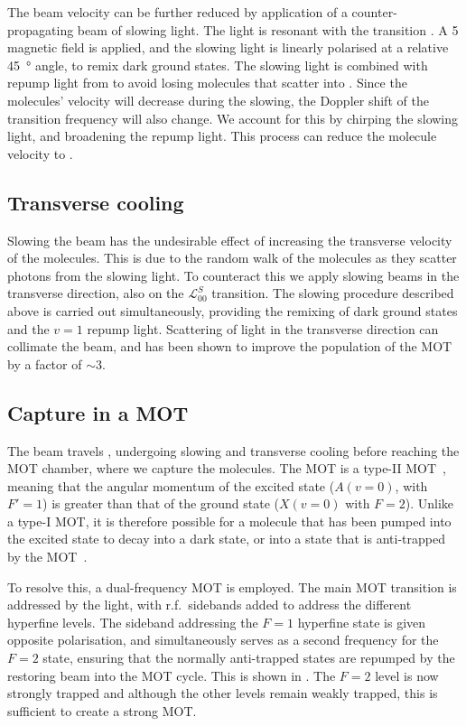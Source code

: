 The beam velocity can be further reduced by application of a counter-propagating
beam of slowing light. The light is resonant with the  transition . A \SI{5}{\gauss} magnetic field is
applied, and the slowing light is linearly polarised at a relative
\SI{45}{\degree} angle, to remix dark ground states. The slowing light is
combined with repump light from 
to avoid losing molecules that scatter into . Since the molecules'
velocity will decrease during the slowing, the Doppler shift of the transition
frequency will also change. We account for this by chirping the slowing light,
and broadening the repump light. This process can reduce the molecule velocity
to .

\subsection*{Transverse cooling}

Slowing the beam has the undesirable effect of increasing the transverse
velocity of the molecules. This is due to the random walk of the molecules as
they scatter photons from the slowing light. To counteract this we apply
slowing beams in the transverse direction, also on the $\mathcal{L}_{00}^S$
transition. The slowing procedure described above is carried out
simultaneously, providing the remixing of dark ground states and the $v=1$
repump light.
%
Scattering of light in the transverse direction can collimate the beam, and has
been shown to improve the population of the MOT by a factor of $\sim3$. 

\subsection*{Capture in a MOT}

The \CaF{} beam travels , undergoing slowing and transverse
cooling before reaching the MOT chamber, where we capture the molecules. The
\CaF{} MOT is a type-II MOT~\cite{}, meaning that the angular momentum of the
excited state ($A(v=0)$, with $F'=1$) is greater than that of the ground state
($X(v=0)$ with $F=2$). Unlike a type-I MOT, it is therefore possible for a
molecule that has been pumped into the excited state to decay into a dark
state, or into a state that is anti-trapped by the MOT~\cite{}.

To resolve this, a dual-frequency MOT is employed. The main MOT transition is
addressed by the  light, with r.f.\ sidebands added to address
the different hyperfine levels. The sideband addressing the $F=1$ hyperfine
state is given opposite polarisation, and simultaneously serves as a second
frequency for the $F=2$ state, ensuring that the normally anti-trapped states
are repumped by the restoring beam into the MOT cycle. This is shown in . The $F=2$ level is now strongly trapped and although the other levels
remain weakly trapped, this is sufficient to create a strong MOT.

